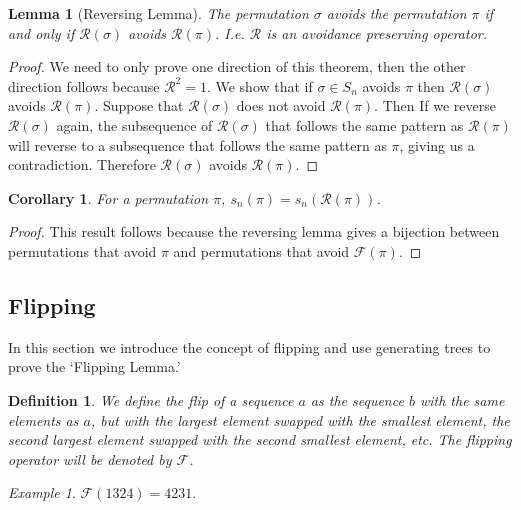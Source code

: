 \documentclass[11pt,letterpaper,twoside,english]{article}
\theoremstyle{theorem}
\newtheorem{corollary}[theorem]{Corollary}
\newtheorem{lemma}[theorem]{Lemma}
\newtheorem{definition}[theorem]{Definition}
\theoremstyle{remark}
\newtheorem{example}{Example}
\begin{document}
\begin{lemma}[Reversing Lemma]
The permutation $\sigma$ avoids the permutation $\pi$ if and only if $\mathcal{R}(\sigma)$ avoids $\mathcal{R}(\pi)$. I.e. $\mathcal{R}$ is an avoidance preserving operator. 
\end{lemma}
\begin{proof}
We need to only prove one direction of this theorem, then the other direction follows because $\mathcal{R}^2=1$. We show that if ${\sigma}\in S_n$ avoids $\pi$ then $\mathcal{R}(\sigma)$ avoids $\mathcal{R}(\pi)$. Suppose that $\mathcal{R}(\sigma)$ does not avoid $\mathcal{R}(\pi)$. Then If we reverse $\mathcal{R}(\sigma)$ again, the subsequence of $\mathcal{R}(\sigma)$ that follows the same pattern as $\mathcal{R}(\pi)$ will reverse to a subsequence that follows the same pattern as $\pi$, giving us a contradiction. Therefore $\mathcal{R}(\sigma)$ avoids $\mathcal{R}(\pi)$. 

\end{proof}

\begin{corollary} 
For a permutation $\pi$, $s_n(\pi)=s_n(\mathcal{R}(\pi))$. 
\end{corollary}
\begin{proof}
This result follows because the reversing lemma gives a bijection between permutations that avoid $\pi$ and permutations that avoid $\mathcal{F}(\pi)$. 
\end{proof}

\subsection{Flipping}
In this section we introduce the concept of flipping and use generating trees to prove the `Flipping Lemma.'
\begin{definition}
We define the \emph{flip} of a sequence $a$ as the sequence $b$ with the same elements as $a$, but with the largest element swapped with the smallest element, the second largest element swapped with the second smallest element, etc.  The flipping operator will be denoted by $\mathcal{F}$.  
\end{definition}

\begin{example}
$\mathcal{F}(1324)=4231$.
\end{example}
\end{document}
